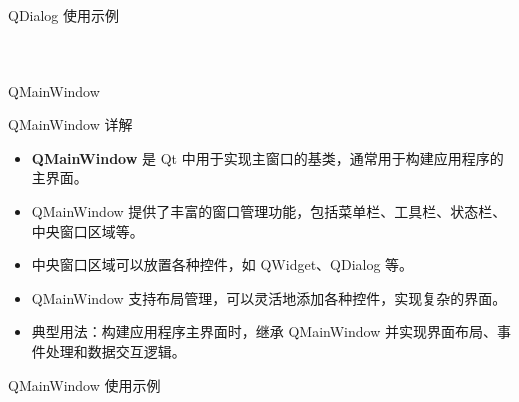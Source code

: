 \documentclass[UTF8,aspectratio=169]{beamer}
\begin{document}
\begin{frame}[fragile]{QDialog 使用示例}
    \begin{columns}
        \begin{column}{0.48\textwidth}
            \inputminted[firstline=1,lastline=20]{cpp}{code/qt_dialog_example.cpp}
        \end{column}
        \begin{column}{0.48\textwidth}
            \inputminted[firstline=21,lastline=40]{cpp}{code/qt_dialog_example.cpp}
        \end{column}
    \end{columns}
\end{frame}

\begin{frame}{QMainWindow}
    \begin{ytublock}{QMainWindow 详解}
        \begin{itemize}
            \item \textbf{QMainWindow} 是 Qt 中用于实现主窗口的基类，通常用于构建应用程序的主界面。
            \item QMainWindow 提供了丰富的窗口管理功能，包括菜单栏、工具栏、状态栏、中央窗口区域等。
            \item 中央窗口区域可以放置各种控件，如 QWidget、QDialog 等。
            \item QMainWindow 支持布局管理，可以灵活地添加各种控件，实现复杂的界面。
            \item 典型用法：构建应用程序主界面时，继承 QMainWindow 并实现界面布局、事件处理和数据交互逻辑。
        \end{itemize}
    \end{ytublock}
\end{frame}

\begin{frame}[fragile]{QMainWindow 使用示例}
    \begin{columns}
        \begin{column}{0.48\textwidth}
            \inputminted[firstline=1,lastline=15]{cpp}{code/qt_mainwindow_example.cpp}
        \end{column}
        \begin{column}{0.48\textwidth}
            \inputminted[firstline=17,lastline=32]{cpp}{code/qt_mainwindow_example.cpp}
        \end{column}
    \end{columns}
\end{frame}
\end{document}

